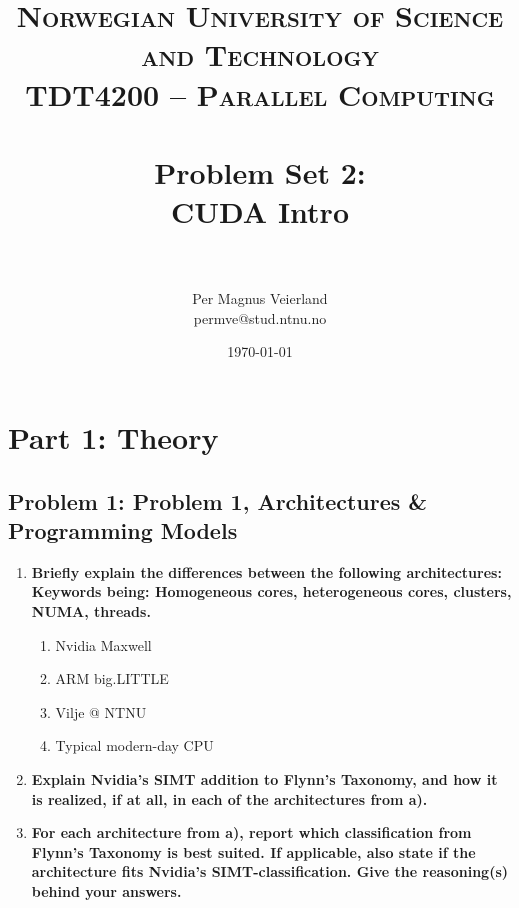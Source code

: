 

\title{	
\normalfont \normalsize 
\textsc{Norwegian University of Science and Technology\\TDT4200 -- Parallel Computing} \\ [25pt]
\horrule{0.5pt} \\[0.4cm]
\huge Problem Set 2:\\ CUDA Intro\\
\horrule{2pt} \\[0.5cm]
}

\author{Per Magnus Veierland\\permve@stud.ntnu.no}


\date{\normalsize\today}



\maketitle

\section*{Part 1: Theory}

\subsection*{Problem 1: Problem 1, Architectures \& Programming Models}

\begin{enumerate}

\item \textbf{Briefly explain the differences between the following architectures:\\
Keywords being: Homogeneous cores, heterogeneous cores, clusters, NUMA, threads.}

\begin{enumerate}
\item Nvidia Maxwell
\item ARM big.LITTLE
\item Vilje @ NTNU
\item Typical modern-day CPU
\end{enumerate}

\item \textbf{Explain Nvidia's SIMT addition to Flynn's Taxonomy, and how it is realized, if at all, in each of the architectures from a).}

\item \textbf{For each architecture from a), report which classification from Flynn's Taxonomy is best suited. If applicable, also state if the architecture fits Nvidia's SIMT-classification. Give the reasoning(s) behind your answers.}

\end{enumerate}

